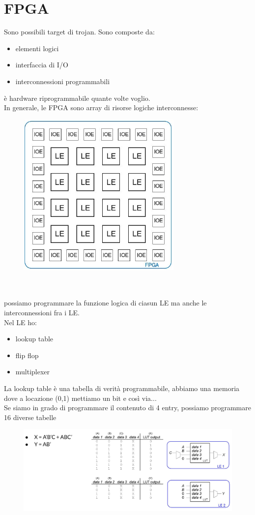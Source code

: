 \documentclass[oneside, 12pt]{extbook}
\begin{document}
\section{FPGA}
Sono possibili target di trojan. Sono composte da:
\begin{itemize}
	\item elementi logici
	\item interfaccia di I/O
	\item interconnessioni programmabili
\end{itemize}
è hardware riprogrammabile quante volte voglio.
\\In generale, le FPGA sono array di risorse logiche interconnesse:\\ 
\begin{figure}[!h]
	\includegraphics[scale=0.6]{immagini/hardware/fpga.png}
\end{figure}
\\\\possiamo programmare la funzione logica di ciasun LE ma anche le interconnessioni fra i LE.
\\Nel LE ho:
\begin{itemize}
	\item lookup table
	\item flip flop
	\item multiplexer
\end{itemize}
La lookup table è una tabella di verità programmabile, abbiamo una memoria dove a locazione (0,1) mettiamo un bit e così via... 
\\Se siamo in grado di programmare il contenuto di 4 entry, possiamo programmare 16 diverse tabelle
\begin{figure}[!h]
	\includegraphics[scale=0.4]{immagini/hardware/le_conf.png}
\end{figure}
\end{document}

